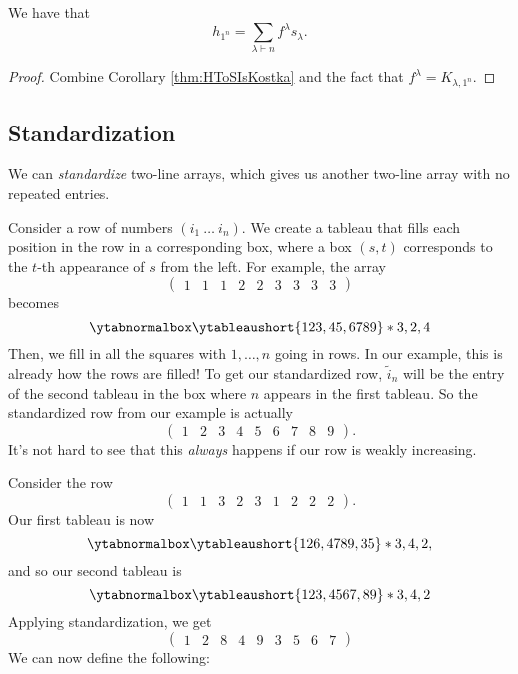 \documentclass{article}
\begin{document}
\begin{corollary}
    We have that
    \[
        h_{1^n} = \sum_{\lambda \vdash n} f^\lambda s_\lambda.
    \]
\end{corollary}

\begin{proof}
    Combine Corollary \ref{thm:HToSIsKostka} and the fact that $f^\lambda = K_{\lambda,1^n}$.
\end{proof}

\subsection{Standardization}

We can \textit{standardize} two-line arrays, which gives us another two-line array with no repeated entries.

Consider a row of numbers $(i_1\: \ldots\: i_n)$. 
We create a tableau that fills each position in the row in a corresponding box, where a box $(s,t)$ corresponds to the $t$-th appearance of $s$ from the left.
For example, the array
\[
    \begin{pmatrix}
        1 & 1 & 1 & 2 & 2 & 3 & 3 & 3 & 3
    \end{pmatrix}
\]
becomes
\[
    \ytabnormalbox
    \ytableaushort{123,45,6789}*{3,2,4}
\]
Then, we fill in all the squares with $1,\ldots,n$ going in rows.
In our example, this is already how the rows are filled!
To get our standardized row, $\tilde{i}_n$ will be the entry of the second tableau in the box where $n$ appears in the first tableau.
So the standardized row from our example is actually
\[
    \begin{pmatrix}
        1 & 2 & 3 & 4 & 5 & 6 & 7 & 8 & 9
    \end{pmatrix}.
\]
It's not hard to see that this \textit{always} happens if our row is weakly increasing.

Consider the row
\[
    \begin{pmatrix}
        1 & 1 & 3 & 2 & 3 & 1 & 2 & 2 & 2
    \end{pmatrix}.
\]
Our first tableau is now
\[
    \ytabnormalbox
    \ytableaushort{126,4789,35}*{3,4,2},
\]
and so our second tableau is
\[
    \ytabnormalbox
    \ytableaushort{123,4567,89}*{3,4,2}
\]
Applying standardization, we get
\[
    \begin{pmatrix}
        1 & 2 & 8 & 4 & 9 & 3 & 5 & 6 & 7
    \end{pmatrix}
\]
We can now define the following:
\end{document}
